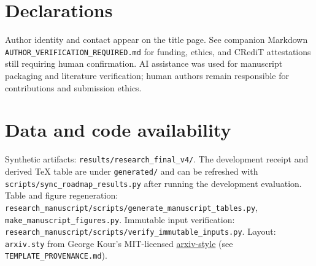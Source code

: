 \documentclass{article}
\begin{document}
\section*{Declarations}
Author identity and contact appear on the title page.
See companion Markdown \texttt{AUTHOR\_VERIFICATION\_REQUIRED.md} for funding, ethics, and CRediT
attestations still requiring human confirmation.
AI assistance was used for manuscript packaging and literature verification; human authors remain
responsible for contributions and submission ethics.

\section*{Data and code availability}
Synthetic artifacts: \texttt{results/research\_final\_v4/}.
The development receipt and derived TeX table are under \texttt{generated/} and can be refreshed
with \texttt{scripts/sync\_roadmap\_results.py} after running the development evaluation.
Table and figure regeneration:
\texttt{research\_manuscript/scripts/generate\_manuscript\_tables.py},
\texttt{make\_manuscript\_figures.py}.
Immutable input verification:
\texttt{research\_manuscript/scripts/verify\_immutable\_inputs.py}.
Layout: \texttt{arxiv.sty} from George Kour's MIT-licensed
\href{https://github.com/kourgeorge/arxiv-style}{arxiv-style} (see \texttt{TEMPLATE\_PROVENANCE.md}).



\end{document}

